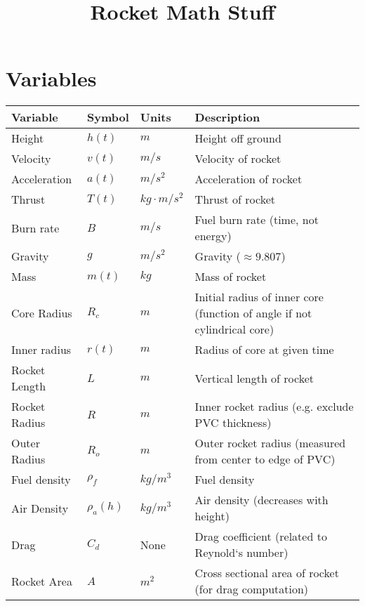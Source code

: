 \documentclass[12pt,a4paper]{article}
\title{Rocket Math Stuff}
\date{}
\begin{document}
\maketitle


\section{Variables}


\begin{tabular}{l | l | l | l}
    \textbf{Variable} & \textbf{Symbol} & \textbf{Units} & \textbf{Description} \\
    \hline
    Height          & $h(t)$      & $m$              & Height off ground \\
    Velocity        & $v(t)$      & $m/s$            & Velocity of rocket \\
    Acceleration    & $a(t)$      & $m/s^2$          & Acceleration of rocket \\
    Thrust          & $T(t)$      & $kg\cdot m/s^2$  & Thrust of rocket \\
    Burn rate       & $B$         & $m/s$            & Fuel burn rate (time, not energy) \\
    Gravity         & $g$         & $m/s^2$          & Gravity ($\approx 9.807$) \\
    Mass            & $m(t)$      & $kg$             & Mass of rocket \\
    Core Radius     & $R_c$       & $m$              & Initial radius of inner core (function of angle if not cylindrical core) \\
    Inner radius    & $r(t)$      & $m$              & Radius of core at given time \\
    Rocket Length   & $L$         & $m$              & Vertical length of rocket \\
    Rocket Radius   & $R$         & $m$              & Inner rocket radius (e.g. exclude PVC thickness) \\
    Outer Radius    & $R_o$       & $m$              & Outer rocket radius (measured from center to edge of PVC) \\
    Fuel density    & $\rho_f$    & $kg/m^3$         & Fuel density \\
    Air Density     & $\rho_a(h)$ & $kg/m^3$         & Air density (decreases with height) \\
    Drag            & $C_d$       & None             & Drag coefficient (related to Reynold‘s number) \\
    Rocket Area     & $A$         & $m^2$            & Cross sectional area of rocket (for drag computation) \\
\end{tabular}
\end{document}
